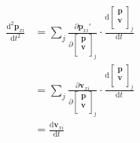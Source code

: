 \documentclass[12pt,letterpaper]{article}
\newcommand{\vep}{\bm{p}}
\newcommand{\vev}{\bm{v}}
\newcommand{\der}[2]{\frac{\text{d} #1}{\text{d} #2}}
\newcommand{\ders}[2]{\frac{\text{d}^2 #1}{{\text{d} #2}^2}}
\newcommand{\pard}[2]{\frac{\partial #1}{\partial #2}}
\begin{document}
    \begin{align*}
        \ders{\vep_{xi}}{t}
        &=\sum_{j}\pard{\vep_{xi}'}{\left[\begin{matrix}\vep\\\vev\\\end{matrix}\right]_j} \cdot \der{\left[\begin{matrix}\vep\\\vev\\\end{matrix}\right]_j}{t}\\
        &=\sum_{j}\pard{\vev_{xi}}{\left[\begin{matrix}\vep\\\vev\\\end{matrix}\right]_j} \cdot \der{\left[\begin{matrix}\vep\\\vev\\\end{matrix}\right]_j}{t}\\
        &=\der{\vev_{xi}}{t}\\
    \end{align*}
\end{document}
